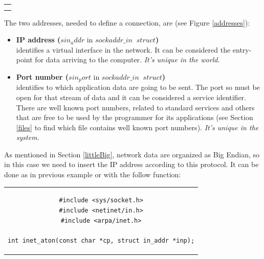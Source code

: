 \begin{center}
\begin{tabular}{c}
\begin{lstlisting}[linewidth=350pt, basicstyle=\footnotesize\sffamily,]
#include <netinet/in.h>

struct sockaddr_in {
    sa_family_t    sin_family; /* address family: AF_INET */
    in_port_t      sin_port;   /* port in network byte order */
    struct in_addr sin_addr;   /* internet address */
};

/* Internet address. */
struct in_addr {
    uint32_t       s_addr;     /* address in network byte order */
};\\
\end{lstlisting}
\end{tabular}
\end{center}
The two addresses, needed to define a connection, are (see Figure \ref{addresses}):
\begin{itemize}
\item{\textbf{IP address (}$sin_addr$ in $sockaddr\_in\;\;struct$\textbf{)}\\
identifies a virtual interface in the network. It can be considered the entry-point for data arriving to the computer. \textit{It's unique in the world.}
}
\item{\textbf{Port number (}$sin_port$ in $sockaddr\_in\;\;struct$\textbf{)}\\
identifies to which application data are going to be sent. The port so must be open for that stream of data and it can be considered a service identifier. There are well known port numbers, related to standard services and others that are free to be used by the programmer for its applications (see Section \ref{files} to find which file contains well known port numbers). \textit{It's unique in the system.}
}
\end{itemize}
As mentioned in Section \ref{littleBig}, network data are organized as Big Endian, so in this case we need to insert the IP address according to this protocol. It can be done as in previous example or with the follow function:
\begin{center}
\begin{tabular}{c}
\begin{lstlisting}[linewidth=280pt, basicstyle=\footnotesize\sffamily,]
#include <sys/socket.h>
#include <netinet/in.h>
#include <arpa/inet.h>

int inet_aton(const char *cp, struct in_addr *inp);
\end{lstlisting}
\end{tabular}
\end{center}
